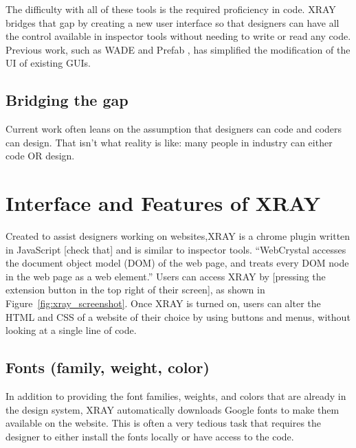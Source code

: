 \documentclass{sigchi}
\newcommand{\xray}{XRAY\xspace}
\begin{document}
The difficulty with all of these tools is the required proficiency in code. \xray bridges that gap by creating a new user interface so that designers can have all the control available in inspector tools without needing to write or read any code. Previous work, such as WADE \cite{WADE_simplified_GUI_add_on_development_Meng_CHI_2014} and Prefab \cite{content_and_hierarchy_in_pixel_based_methords_for_reverse_engineering_interface_structure_Dixon_CHI_2011, prefab_original_paper_Dixon_CHI_2010}, has simplified the modification of the UI of existing GUIs. 

\subsection{Bridging the gap}
Current work often leans on the assumption that designers can code and coders can design. That isn't what reality is like: many people in industry can either code OR design. 



\section{Interface and Features of XRAY}
Created to assist designers working on websites,\xray is a chrome plugin written in JavaScript [check that] and is similar to inspector tools. ``WebCrystal accesses the document object model (DOM) of the web page, and treats every DOM node in the web page as a web element.'' Users can access \xray by [pressing the extension button in the top right of their screen], as shown in Figure~\ref{fig:xray_screenshot}. Once \xray is turned on, users can alter the HTML and CSS of a website of their choice by using buttons and menus, without looking at a single line of code. 

\subsection{Fonts (family, weight, color)}
In addition to providing the font families, weights, and colors that are already in the design system, \xray 
automatically downloads Google fonts to make them available on the website. This is often a very tedious task that requires the designer to either install the fonts locally or have access to the code.
\end{document}
